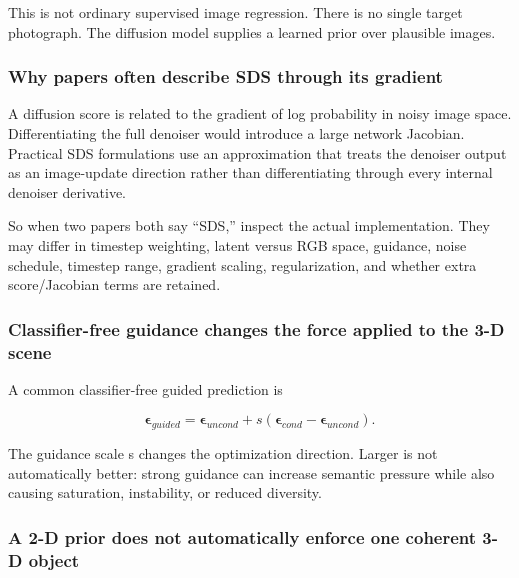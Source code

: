 This is not ordinary supervised image regression. There is no single target photograph. The diffusion model supplies a learned prior over plausible images.

\subsubsection{Why papers often describe SDS through its gradient}\label{04-visual-computing-ii-ch035-why-papers-often-describe-sds-through-its-gradient}

\hypertarget{04-visual-computing-ii-ch035-why-papers-often-describe-sds-through-its-gradient}{}

A diffusion score is related to the gradient of log probability in noisy image space. Differentiating the full denoiser would introduce a large network Jacobian. Practical SDS formulations use an approximation that treats the denoiser output as an image-update direction rather than differentiating through every internal denoiser derivative.

So when two papers both say ``SDS,'' inspect the actual implementation. They may differ in timestep weighting, latent versus RGB space, guidance, noise schedule, timestep range, gradient scaling, regularization, and whether extra score/Jacobian terms are retained.

\subsubsection{Classifier-free guidance changes the force applied to the 3-D scene}\label{04-visual-computing-ii-ch035-classifier-free-guidance-changes-the-force-applied-to-the-3-d-scene}

\hypertarget{04-visual-computing-ii-ch035-classifier-free-guidance-changes-the-force-applied-to-the-3-d-scene}{}

A common classifier-free guided prediction is

\[\boldsymbol\epsilon_{guided}=\boldsymbol\epsilon_{uncond}+s(\boldsymbol\epsilon_{cond}-\boldsymbol\epsilon_{uncond}).\]

The guidance scale s changes the optimization direction. Larger is not automatically better: strong guidance can increase semantic pressure while also causing saturation, instability, or reduced diversity.

\subsubsection{A 2-D prior does not automatically enforce one coherent 3-D object}\label{04-visual-computing-ii-ch035-a-2-d-prior-does-not-automatically-enforce-one-coherent-3-d-object}

